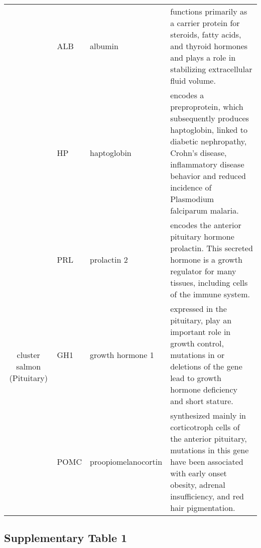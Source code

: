 \begin{table}
\begin{center}
\begin{tabular}{|c|p{0.5in}|p{1.4in}|p{3.6in}|}
 					      &  \small{ALB} & \footnotesize{albumin} & \scriptsize{functions primarily as a carrier protein for steroids, fatty acids, and thyroid hormones and plays a role in stabilizing extracellular fluid volume.} \\
					      &  \small{HP} & \footnotesize{haptoglobin} & \scriptsize{encodes a preproprotein, which subsequently  produces haptoglobin, linked to diabetic nephropathy, Crohn's disease, inflammatory disease behavior and reduced incidence of Plasmodium falciparum malaria.}\\
\hline					      
 \multirow{3}{4em}{\small{cluster salmon (Pituitary)}}&  \small{PRL} & \footnotesize{prolactin 2} & \scriptsize{encodes the anterior pituitary hormone prolactin. This secreted hormone is a growth regulator for many tissues, including cells of the immune system.} \\
 					      &  \small{GH1} & \footnotesize{growth hormone 1} & \scriptsize{expressed in the pituitary, play an important role in growth control, mutations in or deletions of the gene lead to growth hormone deficiency and short stature.}\\
					      &  \small{POMC} & \footnotesize{proopiomelanocortin} & \scriptsize{synthesized mainly in corticotroph cells of the anterior pituitary, mutations in this gene have been associated with early onset obesity, adrenal insufficiency, and red hair pigmentation.} \\
\hline
 \end{tabular}
 \end{center}
\end{table}

\clearpage

\subsection{Supplementary Table 1}

